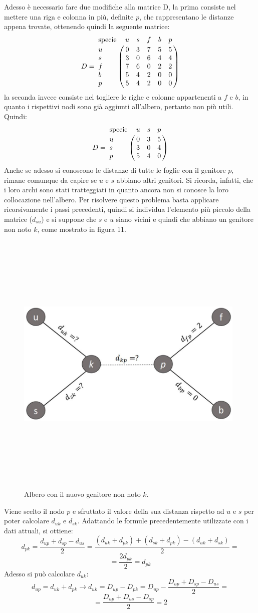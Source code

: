 Adesso è necessario fare due modifiche alla matrice D, la prima consiste nel mettere una riga e colonna in più, definite $p$, che rappresentano le distanze appena trovate, ottenendo quindi la seguente matrice:
\[
D = \bordermatrix{\text{specie}&u&s&f&b&p\cr
                u& 0 & 3 & 7 & 5 & 5\cr
                s& 3 & 0 & 6 & 4 & 4\cr
                f& 7 & 6 & 0 & 2 & 2\cr
                b& 5 & 4 & 2 & 0 & 0\cr
                p&  5 & 4 & 2 & 0 & 0}
\]
la seconda invece consiste nel togliere le righe e colonne appartenenti a $f$ e $b$, in quanto i rispettivi nodi sono già aggiunti all'albero, pertanto non più utili. Quindi:
\[
D = \bordermatrix{\text{specie}&u&s&p\cr
                u& 0 & 3 & 5\cr
                s& 3 & 0 & 4\cr
                p&  5 & 4 & 0}
\]
Anche se adesso si conoscono le distanze di tutte le foglie con il genitore $p$, rimane comunque da capire se $u$ e $s$ abbiano altri genitori. Si ricorda, infatti, che i loro archi sono stati tratteggiati in quanto ancora non si conosce la loro collocazione nell'albero.
Per risolvere questo problema basta applicare ricorsivamente i passi precedenti, quindi si individua l'elemento più piccolo della matrice ($d_{su}$) e si suppone che $s$ e $u$ siano vicini e quindi che abbiano un genitore non noto $k$, come mostrato in figura 11.
\newpage
\begin{figure}[h!]
\centering
	\includegraphics[height=13cm, width=11cm, keepaspectratio]{distance_between_s_u.jpg}
 	\caption{Albero con il nuovo genitore non noto $k$.}
  	\label{fig:neighborsleaves_3}
\end{figure}
Viene scelto il nodo $p$ e sfruttato il valore della sua distanza rispetto ad $u$ e $s$ per poter calcolare $d_{uk}$ e $d_{sk}$. Adattando le formule precedentemente utilizzate con i dati attuali, si ottiene:
\[d_{pk}=\frac{d_{up}+d_{sp}-d_{us}}2=
\frac{(d_{uk}+d_{pk})+(d_{sk}+d_{pk})-(d_{uk}+d_{sk})}2=\]
\[=\frac{2d_{pk}}2=d_{pk}
\]
Adesso si può calcolare $d_{uk}$:
\[d_{up}=d_{uk}+d_{pk} \rightarrow d_{uk}=D_{up}-D_{pk}=D_{up}-\frac{D_{up}+D_{sp}-D_{us}}2=\]
\[=\frac{D_{up}+D_{us}-D_{sp}}2=2\]

